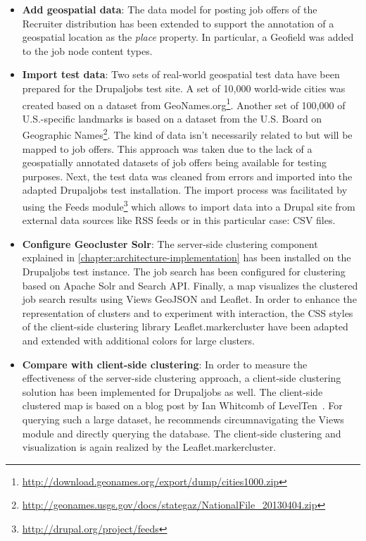 \begin{itemize}

\item \textbf{Add geospatial data}: The data model for posting job offers of the Recruiter distribution has been extended to support the annotation of a geospatial location as the \textit{place} property. In particular, a Geofield was added to the job node content types.

\item \textbf{Import test data}: Two sets of real-world geospatial test data have been prepared for the Drupaljobs test site. A set of 10,000 world-wide cities was created based on a dataset from GeoNames.org\footnote{\url{http://download.geonames.org/export/dump/cities1000.zip}}. Another set of 100,000 of U.S.-specific landmarks is based on a dataset from the U.S. Board on Geographic Names\footnote{\url{http://geonames.usgs.gov/docs/stategaz/NationalFile_20130404.zip}}. The kind of data isn't necessarily related to but will be mapped to job offers. This approach was taken due to the lack of a geospatially annotated datasets of job offers being available for testing purposes. Next, the test data was cleaned from errors and imported into the adapted Drupaljobs test installation. The import process was facilitated by using the Feeds module\footnote{\url{http://drupal.org/project/feeds}} which allows to import data into a Drupal site from external data sources like RSS feeds or in this particular case: CSV files.

\item \textbf{Configure Geocluster Solr}: The server-side clustering component explained in \ref{chapter:architecture-implementation} has been installed on the Drupaljobs test instance. The job search has been configured for clustering based on Apache Solr and Search API. Finally, a map visualizes the clustered job search results using Views GeoJSON and Leaflet. In order to enhance the representation of clusters and to experiment with interaction, the CSS styles of the client-side clustering library Leaflet.markercluster have been adapted and extended with additional colors for large clusters.

\item \textbf{Compare with client-side clustering}: In order to measure the effectiveness of the server-side clustering approach, a client-side clustering solution has been implemented for Drupaljobs as well. The client-side clustered map is based on a blog post by Ian Whitcomb of LevelTen~\cite{blog:leaflet-made-to-order}. For querying such a large dataset, he recommends circumnavigating the Views module and directly querying the database. The client-side clustering and visualization is again realized by the Leaflet.markercluster.

\end{itemize}

